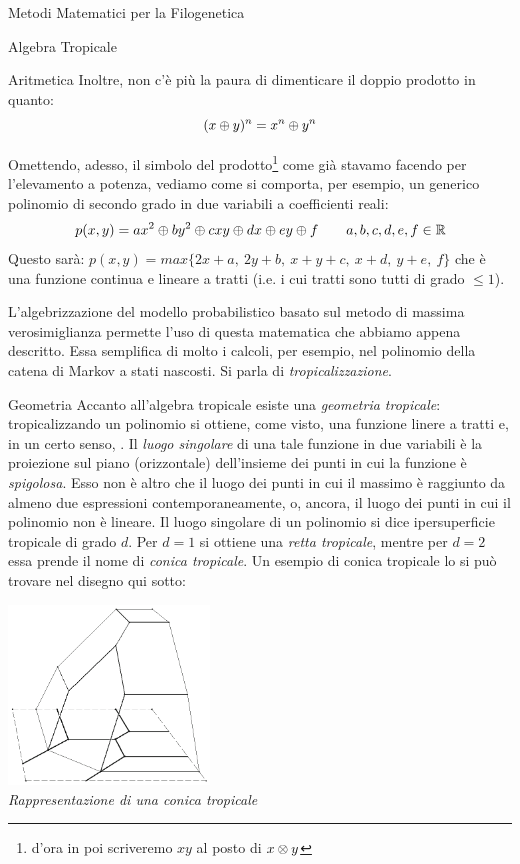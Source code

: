 \documentclass{article}
\begin{document}
\begin{section}{Metodi Matematici per la Filogenetica}
\begin{subsection}{Algebra Tropicale}
\begin{subsubsection}{Aritmetica}
			Inoltre, non c’è più la paura di dimenticare il doppio prodotto in quanto: $$(x \oplus y)^n = x^n \oplus y^n$$
			
			Omettendo, adesso, il simbolo del prodotto\footnote{d'ora in poi scriveremo $xy$ al posto di $x\otimes y$} come già stavamo facendo per l'elevamento a potenza, vediamo come si comporta, per esempio, un generico polinomio di secondo grado in due variabili a coefficienti reali: $$ p(x,y) = ax^2 \oplus by^2 \oplus cxy \oplus dx \oplus ey \oplus f \qquad a,b,c,d,e,f \in \mathbb{R}$$
			Questo sarà: $\displaystyle p(x,y) = max\{2x+a,\ 2y+b,\ x+y+c,\ x+d,\ y+e,\ f \}$ 
			che è una funzione continua e lineare a tratti (i.e. i cui tratti sono tutti di grado $\leq1$). 
			
			L’algebrizzazione del modello probabilistico basato sul metodo di massima verosimiglianza permette l’uso di questa  matematica che abbiamo appena descritto. Essa semplifica di molto i calcoli, per esempio, nel polinomio della catena di Markov a stati nascosti. Si parla di \emph{tropicalizzazione}.
			\end{subsubsection}
		
			\begin{subsubsection}{Geometria}
			Accanto all’algebra tropicale esiste una \emph{geometria tropicale}: tropicalizzando un polinomio si ottiene, come visto, una funzione linere a tratti e, in un certo senso, . Il \emph{luogo singolare} di una tale funzione in due variabili è la proiezione sul piano (orizzontale) dell’insieme dei punti in cui la funzione è \emph{spigolosa}. Esso non è altro che il luogo dei punti in cui il massimo è raggiunto da almeno due espressioni contemporaneamente, o, ancora, il luogo dei punti in cui il polinomio non è lineare. Il luogo singolare di un polinomio si dice ipersuperficie tropicale di grado $d$. Per $d = 1$ si ottiene una \emph{retta tropicale}, mentre per $d=2$ essa prende il nome di \emph{conica tropicale}. Un esempio di conica tropicale lo si può trovare nel disegno qui sotto:
			\begin{center}
				\includegraphics[width=0.4\textwidth]{Pics/conica.png}
				\\ \vspace{3pt}
				\emph{Rappresentazione di una conica tropicale}
				\vspace{6pt}
			\end{center}
			

\end{subsubsection}
\end{subsection}
\end{section}
\end{document}
